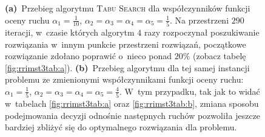 \begin{figure}[!h]
{		 \textbf{(a)}~Przebieg algorytmu \textsc{Tabu Search} dla współczynników funkcji oceny ruchu $\alpha_{1} = \frac{1}{10}$, $\alpha_{2} = \alpha_{3} = \alpha_{4} = \alpha_{5} = \frac{1}{5}$.
		 Na przestrzeni $290$ iteracji, w~czasie których algorytm $4$ razy rozpoczynał poszukiwanie rozwiązania w~innym punkcie przestrzeni rozwiązań, początkowe rozwiązanie zdołano poprawić o~nieco ponad $20\%$ (zobacz tabelę \ref{fig:rrimst3tab:a}).
		 \textbf{(b)}~Przebieg algorytmu dla tej samej instancji problemu ze zmienionymi współczynnikami funkcji oceny ruchu: $\alpha_{1} = \frac{1}{5}$, $\alpha_{2} = \alpha_{3} = \alpha_{4} = \alpha_{5} = \frac{4}{5}$.
		 W~tym przypadku, tak jak to widać w~tabelach \ref{fig:rrimst3tab:a} oraz \ref{fig:rrimst3tab:b}, zmiana sposobu podejmowania decyzji odnośnie następnych ruchów pozwoliła jeszcze bardziej zbliżyć się do optymalnego rozwiązania dla problemu.
	}
	\label{fig:rrimst3}
\end{figure}

